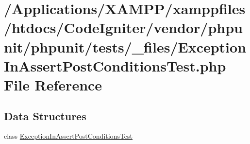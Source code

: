 \hypertarget{_exception_in_assert_post_conditions_test_8php}{}\section{/\+Applications/\+X\+A\+M\+P\+P/xamppfiles/htdocs/\+Code\+Igniter/vendor/phpunit/phpunit/tests/\+\_\+files/\+Exception\+In\+Assert\+Post\+Conditions\+Test.php File Reference}
\label{_exception_in_assert_post_conditions_test_8php}
\subsection*{Data Structures}
\begin{DoxyCompactItemize}
\item 
class \mbox{\hyperlink{class_exception_in_assert_post_conditions_test}{Exception\+In\+Assert\+Post\+Conditions\+Test}}
\end{DoxyCompactItemize}
